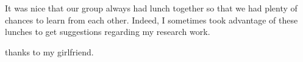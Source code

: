 {It was nice that our group always had lunch together
so that we had plenty of chances to learn from each other.
Indeed, I sometimes took advantage of these lunches
to get suggestions regarding my research work.

thanks to my girlfriend.

}
